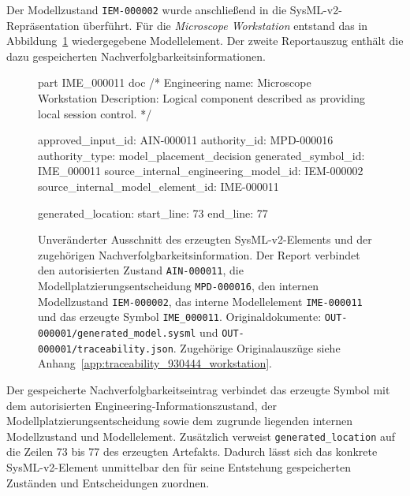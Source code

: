 Der Modellzustand \texttt{IEM-000002} wurde anschließend in die
SysML-v2-Repräsentation überführt. Für die \emph{Microscope Workstation}
entstand das in Abbildung~\ref{fig:result_930444_sysml} wiedergegebene
Modellelement. Der zweite Reportauszug enthält die dazu gespeicherten
Nachverfolgbarkeitsinformationen.

\begin{figure}[htbp]
    \centering
    \begin{minipage}{0.94\textwidth}
        \begin{evidencebox}
part IME_000011 {
    doc /* Engineering name: Microscope Workstation
    Description:
    Logical component described as providing local
    session control. */
}
        \end{evidencebox}

        \begin{evidencebox}
approved_input_id:                    AIN-000011
authority_id:                         MPD-000016
authority_type:                       model_placement_decision
generated_symbol_id:                  IME_000011
source_internal_engineering_model_id: IEM-000002
source_internal_model_element_id:     IME-000011

generated_location:
  start_line: 73
  end_line:   77
        \end{evidencebox}
    \end{minipage}
    \caption[SysML-v2-Element und Nachverfolgbarkeitsinformation]{
    Unveränderter Ausschnitt des erzeugten SysML-v2-Elements und der
    zugehörigen Nachverfolgbarkeitsinformation. Der Report verbindet den
    autorisierten Zustand \texttt{AIN-000011}, die
    Modellplatzierungsentscheidung \texttt{MPD-000016}, den internen
    Modellzustand \texttt{IEM-000002}, das interne Modellelement
    \texttt{IME-000011} und das erzeugte Symbol
    \texttt{IME\_000011}. Originaldokumente:
    \texttt{OUT-000001/generated\_model.sysml} und
    \texttt{OUT-000001/traceability.json}. Zugehörige Originalauszüge siehe
    Anhang~\ref{app:traceability_930444_workstation}.}
    \label{fig:result_930444_sysml}
\end{figure}

Der gespeicherte Nachverfolgbarkeitseintrag verbindet das erzeugte Symbol
mit dem autorisierten Engineering-Informationszustand, der
Modellplatzierungsentscheidung sowie dem zugrunde liegenden internen
Modellzustand und Modellelement. Zusätzlich verweist
\texttt{generated\_location} auf die Zeilen 73 bis 77 des erzeugten
Artefakts. Dadurch lässt sich das konkrete SysML-v2-Element unmittelbar den
für seine Entstehung gespeicherten Zuständen und Entscheidungen zuordnen.

